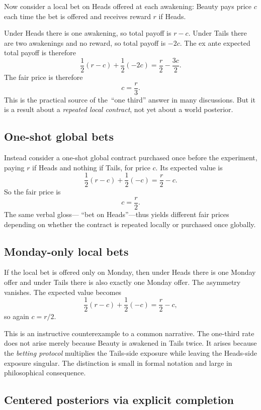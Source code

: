 \documentclass[11pt]{article}
\newcommand{\1}{\mathbf{1}}
\begin{document}
Now consider a local bet on Heads offered at each awakening: Beauty pays price $c$ each time the bet is offered and receives reward $r$ if Heads.

Under Heads there is one awakening, so total payoff is $r-c$. Under Tails there are two awakenings and no reward, so total payoff is $-2c$. The ex ante expected total payoff is therefore
\[
\frac{1}{2}(r-c) + \frac{1}{2}(-2c) = \frac{r}{2} - \frac{3c}{2}.
\]
The fair price is therefore
\[
c = \frac{r}{3}.
\]
This is the practical source of the \,``one third'' answer in many discussions. But it is a result about a \emph{repeated local contract}, not yet about a world posterior.

\subsection{One-shot global bets}

Instead consider a one-shot global contract purchased once before the experiment, paying $r$ if Heads and nothing if Tails, for price $c$. Its expected value is
\[
\frac{1}{2}(r-c) + \frac{1}{2}(-c) = \frac{r}{2} - c.
\]
So the fair price is
\[
c = \frac{r}{2}.
\]
The same verbal gloss---
\enquote{bet on Heads}---thus yields different fair prices depending on whether the contract is repeated locally or purchased once globally.

\subsection{Monday-only local bets}

If the local bet is offered only on Monday, then under Heads there is one Monday offer and under Tails there is also exactly one Monday offer. The asymmetry vanishes. The expected value becomes
\[
\frac{1}{2}(r-c)+\frac{1}{2}(-c)=\frac{r}{2}-c,
\]
so again $c=r/2$.

This is an instructive counterexample to a common narrative. The one-third rate does not arise merely because Beauty is awakened in Tails twice. It arises because the \emph{betting protocol} multiplies the Tails-side exposure while leaving the Heads-side exposure singular. The distinction is small in formal notation and large in philosophical consequence.

\subsection{Centered posteriors via explicit completion}
\end{document}
